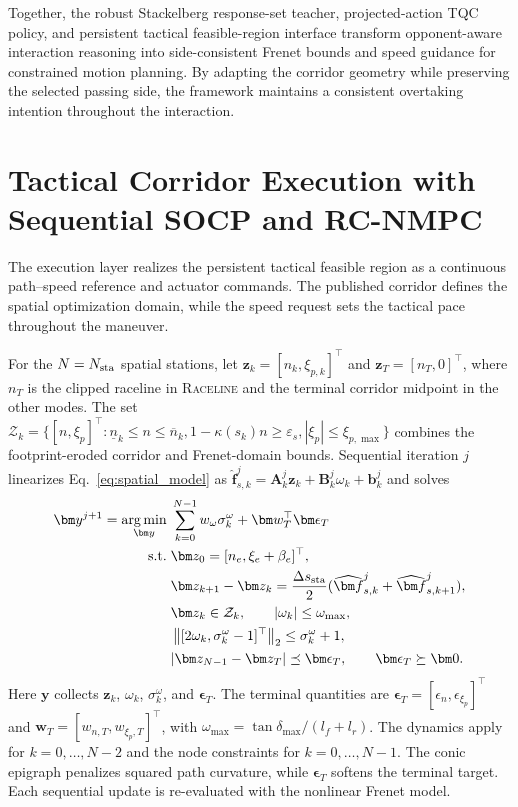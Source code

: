 \documentclass[sensors,article,submit,moreauthors]{Definitions/mdpi}
\DeclareMathOperator*{\argmin}{arg\,min}
\begin{document}
Together, the robust Stackelberg response-set teacher, projected-action TQC
policy, and persistent tactical feasible-region interface transform
opponent-aware interaction reasoning into side-consistent Frenet bounds and
speed guidance for constrained motion planning. By adapting the corridor
geometry while preserving the selected passing side, the framework maintains
a consistent overtaking intention throughout the interaction.


\section{Tactical Corridor Execution with Sequential SOCP and \mbox{RC-NMPC}}
\label{sec:execution}\label{sec:planner}\label{sec:controller}

The execution layer realizes the persistent tactical feasible region as a
continuous path--speed reference and actuator commands. The published corridor
defines the spatial optimization domain, while the speed request sets the
tactical pace throughout the maneuver.

For the $N=N_{\rm sta}$ spatial stations, let
$\bm z_k=[n_k,\xi_{p,k}]^\top$ and $\bm z_T=[n_T,0]^\top$, where $n_T$ is the
clipped raceline in \textsc{Raceline} and the terminal corridor midpoint in
the other modes. The set
$\mathcal Z_k=\{[n,\xi_p]^\top:\underline n_k\le n\le\overline n_k,
1-\kappa(s_k)n\ge\varepsilon_s,|\xi_p|\le\xi_{p,\max}\}$
combines the footprint-eroded corridor and Frenet-domain bounds. Sequential
iteration $j$ linearizes Eq.~\eqref{eq:spatial_model} as
$\widehat{\bm f}_{s,k}^{j}=\bm A_k^j\bm z_k+\bm B_k^j\omega_k+\bm b_k^j$
and solves
\begin{equation}
\begin{aligned}
\bm y^{j+1}=\argmin_{\bm y}\;&
\sum_{k=0}^{N-1}w_\omega\sigma_k^\omega
+\bm w_T^\top\bm\epsilon_T\\
\mathrm{s.t.}\;&\bm z_0=[n_e,\xi_e+\beta_e]^\top,\\
&\bm z_{k+1}-\bm z_k=\frac{\Delta s_{\rm sta}}{2}
 (\widehat{\bm f}_{s,k}^{j}+\widehat{\bm f}_{s,k+1}^{j}),\\
&\bm z_k\in\mathcal Z_k,\qquad |\omega_k|\le\omega_{\max},\\
&\left\|[2\omega_k,\sigma_k^\omega-1]^\top\right\|_2
\le\sigma_k^\omega+1,\\
&|\bm z_{N-1}-\bm z_T|\preceq\bm\epsilon_T,\qquad
\bm\epsilon_T\succeq\bm0 .
\end{aligned}
\label{eq:execution_socp}
\end{equation}
Here $\bm y$ collects $\bm z_k$, $\omega_k$, $\sigma_k^\omega$, and
$\bm\epsilon_T$. The terminal quantities are
$\bm\epsilon_T=[\epsilon_n,\epsilon_{\xi_p}]^\top$ and
$\bm w_T=[w_{n,T},w_{\xi_p,T}]^\top$, with
$\omega_{\max}=\tan\delta_{\max}/(l_f+l_r)$. The dynamics apply for
$k=0,\ldots,N-2$ and the node constraints for $k=0,\ldots,N-1$. The conic
epigraph penalizes squared path curvature, while $\bm\epsilon_T$ softens the
terminal target. Each sequential update is re-evaluated with the nonlinear
Frenet model.
\end{document}
